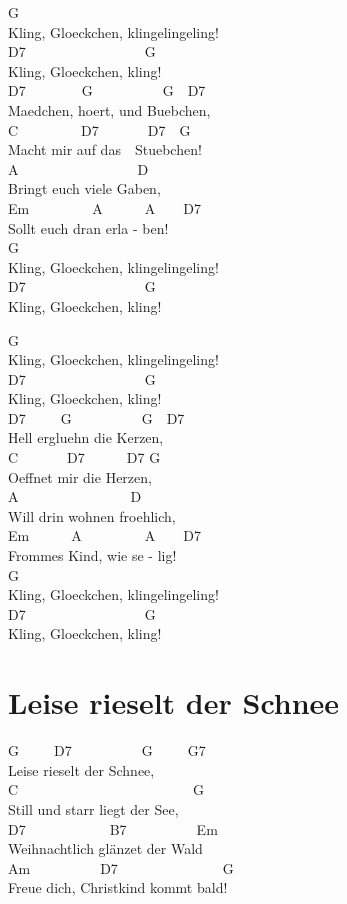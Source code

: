 \documentclass[
  letterpaper,
]{scrbook}
\begin{document}
G\\
Kling, Gloeckchen, klingelingeling!\\
D7~~~~~~~~~~~~~~~~~G\\
Kling, Gloeckchen, kling!\\
D7~~~~~~~~G~~~~~~~~~~G~~D7\\
Maedchen, hoert, und Buebchen,\\
C~~~~~~~~~D7~~~~~~~D7~~G\\
Macht mir auf das~~Stuebchen!\\
A~~~~~~~~~~~~~~~~~D\\
Bringt euch viele Gaben,\\
Em~~~~~~~~~A~~~~~~A~~~~D7\\
Sollt euch dran erla - ben!\\
G\\
Kling, Gloeckchen, klingelingeling!\\
D7~~~~~~~~~~~~~~~~~G\\
Kling, Gloeckchen, kling!~~

G\\
Kling, Gloeckchen, klingelingeling!\\
D7~~~~~~~~~~~~~~~~~G\\
Kling, Gloeckchen, kling!\\
D7~~~~~G~~~~~~~~~~G~~D7\\
Hell ergluehn die Kerzen,\\
C~~~~~~~D7~~~~~~D7 G\\
Oeffnet mir die Herzen,\\
A~~~~~~~~~~~~~~~~D\\
Will drin wohnen froehlich,\\
Em~~~~~~A~~~~~~~~~A~~~~D7\\
Frommes Kind, wie se - lig!\\
G\\
Kling, Gloeckchen, klingelingeling!\\
D7~~~~~~~~~~~~~~~~~G\\
Kling, Gloeckchen, kling!

\hypertarget{leise-rieselt-der-schnee}{%
\chapter{Leise rieselt der Schnee}\label{leise-rieselt-der-schnee}}

G~~~~~D7~~~~~~~~~~G~~~~~G7\\
Leise rieselt der Schnee,\\
C~~~~~~~~~~~~~~~~~~~~~~~~~G\\
Still und starr liegt der See,\\
D7~~~~~~~~~~~~B7~~~~~~~~~~Em\\
Weihnachtlich glänzet der Wald\\
Am~~~~~~~~~~D7~~~~~~~~~~~~~~~G\\
Freue dich, Christkind kommt bald!
\end{document}
